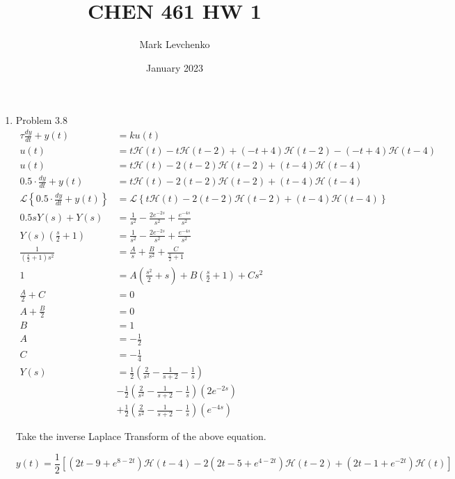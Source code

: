 \documentclass[12pt]{article}
\title{CHEN 461 HW 1}
\author{Mark Levchenko}
\date{January 2023}
\begin{document}
\begin{enumerate}

\newpage
\item Problem 3.8
    \begin{align*}
        \tau \frac{dy}{dt} + y(t) &= k u(t) \\
        u(t) &= t\mathcal{H}(t) - t\mathcal{H}(t - 2) + (-t + 4)\mathcal{H}(t-2) - (-t + 4)\mathcal{H}(t-4) \\
        u(t) &= t\mathcal{H}(t) - 2(t - 2)\mathcal{H}(t - 2) + (t - 4)\mathcal{H}(t-4) \\
        0.5 \cdot \frac{dy}{dt} + y(t) &= t\mathcal{H}(t) - 2(t - 2)\mathcal{H}(t - 2) + (t - 4)\mathcal{H}(t-4) \\
        \mathcal{L}\left\{ 0.5 \cdot \frac{dy}{dt} + y(t) \right\} &= \mathcal{L}\left\{ t\mathcal{H}(t) - 2(t - 2)\mathcal{H}(t - 2) + (t - 4)\mathcal{H}(t-4) \right\} \\
        0.5 s Y(s) + Y(s) &= \frac{1}{s^2} - \frac{2 e^{-2s}}{s^2} + \frac{e^{-4s}}{s^2} \\
        Y(s) \left(\frac{s}{2} + 1\right) &= \frac{1}{s^2} - \frac{2 e^{-2s}}{s^2} + \frac{e^{-4s}}{s^2} \\
        \frac{1}{\left(\frac{s}{2} + 1\right) s^2} &= \frac{A}{s} + \frac{B}{s^2} + \frac{C}{\frac{s}{2} + 1} \\
        1 &= A \left(\frac{s^2}{2} + s\right) + B \left(\frac{s}{2} + 1\right) + Cs^2 \\
        \frac{A}{2} + C &= 0 \\
        A + \frac{B}{2} &= 0 \\
        B &= 1 \\
        A &= -\frac{1}{2} \\
        C &= -\frac{1}{4} \\
        Y(s) &= \frac{1}{2} \left(\frac{2}{s^2} - \frac{1}{s + 2} - \frac{1}{s}\right) \\
        &- \frac{1}{2} \left(\frac{2}{s^2} - \frac{1}{s + 2} - \frac{1}{s}\right) \left( 2 e^{-2s} \right) \\
        &+ \frac{1}{2} \left(\frac{2}{s^2} - \frac{1}{s + 2} - \frac{1}{s}\right) \left( e^{-4s} \right)
    \end{align*}

    Take the inverse Laplace Transform of the above equation.
    
    \[
        \boxed{
        y(t) = \frac{1}{2} \left[ 
                                    {\left( 2t - 9 + e^{8 - 2 t}\right) \mathcal{H}(t - 4)} 
                                    - {2 \left( 2 t - 5 + e^{4 - 2 t}\right) \mathcal{H}(t - 2)} 
                                    + {\left( 2 t - 1 + e^{-2 t}\right) \mathcal{H}(t)} 
                            \right]
        }
    \]


\end{enumerate}
\end{document}
